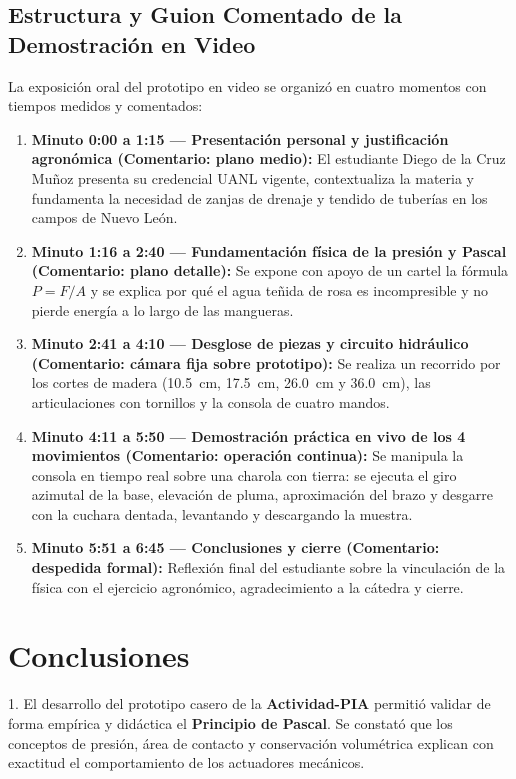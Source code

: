 \subsection{Estructura y Guion Comentado de la Demostración en Video}
La exposición oral del prototipo en video se organizó en cuatro momentos con tiempos medidos y comentados:
\begin{enumerate}
    \item \textbf{Minuto 0:00 a 1:15 --- Presentación personal y justificación agronómica (Comentario: plano medio):} El estudiante Diego de la Cruz Muñoz presenta su credencial UANL vigente, contextualiza la materia y fundamenta la necesidad de zanjas de drenaje y tendido de tuberías en los campos de Nuevo León.
    \item \textbf{Minuto 1:16 a 2:40 --- Fundamentación física de la presión y Pascal (Comentario: plano detalle):} Se expone con apoyo de un cartel la fórmula $P = F/A$ y se explica por qué el agua teñida de rosa es incompresible y no pierde energía a lo largo de las mangueras.
    \item \textbf{Minuto 2:41 a 4:10 --- Desglose de piezas y circuito hidráulico (Comentario: cámara fija sobre prototipo):} Se realiza un recorrido por los cortes de madera (\SI{10.5}{cm}, \SI{17.5}{cm}, \SI{26.0}{cm} y \SI{36.0}{cm}), las articulaciones con tornillos y la consola de cuatro mandos.
    \item \textbf{Minuto 4:11 a 5:50 --- Demostración práctica en vivo de los 4 movimientos (Comentario: operación continua):} Se manipula la consola en tiempo real sobre una charola con tierra: se ejecuta el giro azimutal de la base, elevación de pluma, aproximación del brazo y desgarre con la cuchara dentada, levantando y descargando la muestra.
    \item \textbf{Minuto 5:51 a 6:45 --- Conclusiones y cierre (Comentario: despedida formal):} Reflexión final del estudiante sobre la vinculación de la física con el ejercicio agronómico, agradecimiento a la cátedra y cierre.
\end{enumerate}

\clearpage
\section{Conclusiones}
1. El desarrollo del prototipo casero de la \textbf{Actividad-PIA} permitió validar de forma empírica y didáctica el \textbf{Principio de Pascal}. Se constató que los conceptos de presión, área de contacto y conservación volumétrica explican con exactitud el comportamiento de los actuadores mecánicos.

